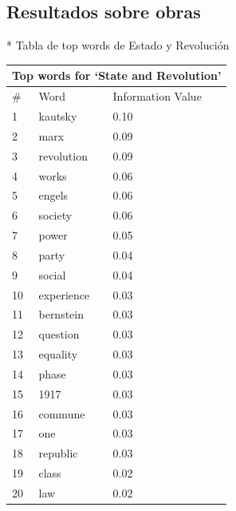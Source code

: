 \documentclass{pnastwo}
\begin{document}
\begin{article}
\subsection{Resultados sobre obras}
* Tabla de top words de Estado y Revolución
\begin{center}
  \begin{tabular}{ | l | l | l |}
    \hline
    \multicolumn{3}{|c|}{Top words for `State and Revolution'} \\ \hline
    \# & Word & Information Value \\ \hline
    1 & kautsky & 0.10 \\ \hline
    2 &  marx & 0.09 \\ \hline
    3 &  revolution & 0.09 \\ \hline
    4 &  works & 0.06 \\ \hline 
    5 & engels & 0.06 \\ \hline
    6 &  society & 0.06 \\ \hline
    7 & power & 0.05 \\ \hline
    8 &  party & 0.04 \\ \hline
    9 &  social & 0.04 \\ \hline
    10 &  experience & 0.03 \\ \hline 
    11 & bernstein & 0.03 \\ \hline
    12 &  question & 0.03 \\ \hline 
    13 & equality & 0.03 \\ \hline
    14 &  phase & 0.03 \\ \hline
    15 & 1917 & 0.03 \\ \hline
    16 & commune & 0.03 \\ \hline
    17 & one & 0.03 \\ \hline
    18 & republic & 0.03 \\ \hline
    19 & class & 0.02 \\ \hline
    20 & law & 0.02 \\ \hline
  \end{tabular}
\end{center}



\end{article}
\end{document}
